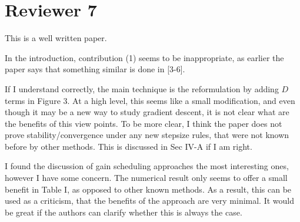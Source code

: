 \section*{Reviewer 7}\label{sec:reviewer7}
\renewcommand{\theequation}{R7.\arabic{equation}}
\setcounter{equation}{0}
\begin{rebuttal}[resolved]
    {%
        This is a well written paper.
    }%
    {%
    }%
\end{rebuttal}
\begin{rebuttal}[resolved]
    {%
        In the introduction, contribution (1) seems to be inappropriate, as earlier the paper says that something similar is done in [3-6].
    }%
    {%
    }%
\end{rebuttal}
\begin{rebuttal}[resolved]
    {%
        If I understand correctly, the main technique is the reformulation by adding $D$ terms in Figure 3. At a high level, this seems like a small modification, and even though it may be a new way to study gradient descent, it is not clear what are the benefits of this view points. To be more clear, I think the paper does not prove stability/convergence under any new stepsize rules, that were not known before by other methods. This is discussed in Sec IV-A if I am right.
    }%
    {%
    }%
\end{rebuttal}
\begin{rebuttal}[pending]
    {%
        I found the discussion of gain scheduling approaches the most interesting ones, however I have some concern. The numerical result only seems to offer a small benefit in Table I, as opposed to other known methods. As a result, this can be used as a criticism, that the benefits of the approach are very minimal. It would be great if the authors can clarify whether this is always the case.
    }%
    {%
    }%
\end{rebuttal}
